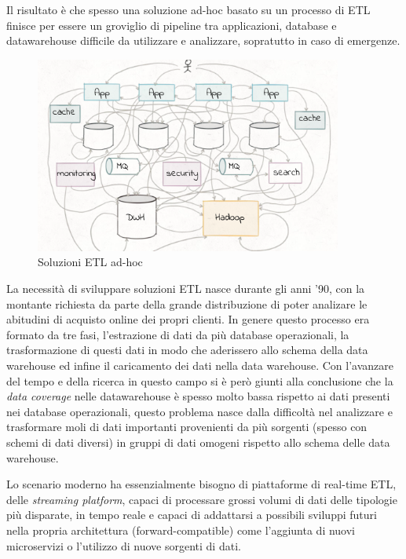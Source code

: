 \documentclass[]{article}
\begin{document}
Il risultato è che spesso una soluzione ad-hoc basato su un processo di
ETL finisce per essere un groviglio di pipeline tra applicazioni,
database e datawarehouse difficile da utilizzare e analizzare,
sopratutto in caso di emergenze.

\begin{figure}
\centering
\includegraphics[width=0.90000\textwidth]{../images/etl-adhoc.png}
\caption{Soluzioni ETL ad-hoc \label{figure_5}}
\end{figure}

La necessità di sviluppare soluzioni ETL nasce durante gli anni '90, con
la montante richiesta da parte della grande distribuzione di poter
analizare le abitudini di acquisto online dei propri clienti. In genere
questo processo era formato da tre fasi, l'estrazione di dati da più
database operazionali, la trasformazione di questi dati in modo che
aderissero allo schema della data warehouse ed infine il caricamento dei
dati nella data warehouse. Con l'avanzare del tempo e della ricerca in
questo campo si è però giunti alla conclusione che la \emph{data
coverage} nelle datawarehouse è spesso molto bassa rispetto ai dati
presenti nei database operazionali, questo problema nasce dalla
difficoltà nel analizzare e trasformare moli di dati importanti
provenienti da più sorgenti (spesso con schemi di dati diversi) in
gruppi di dati omogeni rispetto allo schema delle data warehouse.

Lo scenario moderno ha essenzialmente bisogno di piattaforme di
real-time ETL, delle \emph{streaming platform}, capaci di processare
grossi volumi di dati delle tipologie più disparate, in tempo reale e
capaci di addattarsi a possibili sviluppi futuri nella propria
architettura (forward-compatible) come l'aggiunta di nuovi microservizi
o l'utilizzo di nuove sorgenti di dati.
\end{document}
